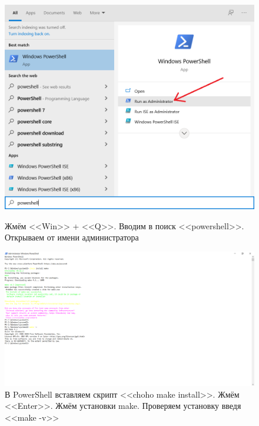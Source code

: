\begin{figure}[!p]
    \centering
    \begin{minipage}{0.47\textwidth}
        \centering
        \includegraphics[width=\linewidth]
            {_assets/gpi_pz_choco_5.png}
        \caption{Жмём <<Win>> + <<Q>>. Вводим в поиск <<powershell>>. Открываем от имени администратора}
        \label{fig:gpi_pz_choco_5}
    \end{minipage}
    \begin{minipage}{0.47\textwidth}
        \centering
        \includegraphics[width=\linewidth]
            {_assets/gpi_pz_choco_6.png}
        \caption{В PowerShell вставляем скрипт <<choho make install>>. Жмём <<Enter>>. Жмём установки make.
        Проверяем установку введя <<make -v>>}
        \label{fig:gpi_pz_choco_6}
    \end{minipage}
\end{figure}

